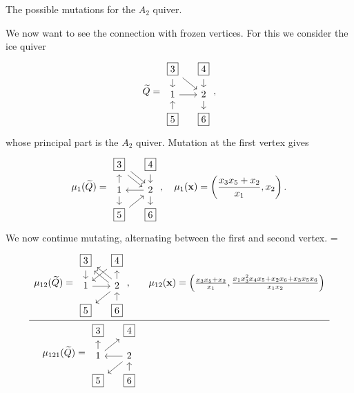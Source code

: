 \begin{example}
\begin{table}[ht!]
		\caption{The possible mutations for the $A_2$ quiver.}
		\label{table:A2_quiver_coefficients}
	\end{table}

	We now want to see the connection with frozen vertices. For this we consider the ice
	quiver
	\begin{equation*}
		\tQ = \begin{tikzcd}[sep=small]
			\boxed{3} \dar \drar & \boxed{4} \dar \\
			1 \rar & 2 \dar \\
			\boxed{5} \uar & \boxed{6}
		\end{tikzcd},
	\end{equation*}
	whose principal part is the $A_2$ quiver. Mutation at the first vertex gives
	\begin{equation*}
		\mu_1(\tQ) = \begin{tikzcd}[sep=small]
			\boxed{3} \ar[dr, shift left] \ar[dr, shift right] & \boxed{4} \dar \\
			1 \uar \dar & 2 \lar \dar \\
			\boxed{5} \urar & \boxed{6}
		\end{tikzcd},\quad
		\mu_1(\bx) = \left(\frac{x_3x_5 + x_2}{x_1}, x_2\right).
	\end{equation*}
	We now continue mutating, alternating between the first and second vertex.
		{
			\everymath={\displaystyle}
			\begin{equation*}
				\begin{array}{rc}
					\mu_{12}(\tQ) = \begin{tikzcd}[sep=small, ampersand replacement=\&]
						                \boxed{3} \dar \ar[dr, shift left, leftarrow] \ar[dr, shift right, leftarrow] \& \boxed{4} \dlar \\
						                1  \rar \& 2 \uar \dlar  \\
						                \boxed{5} \& \boxed{6} \uar
					                \end{tikzcd},\quad &
					\mu_{12}(\bx) = \left(\frac{x_3x_5 + x_2}{x_1}, \frac{x_{1} x_{3}^{2} x_{4} x_{5} + x_{2} x_{6} + x_{3} x_{5} x_{6}}{x_{1} x_{2}}\right)                 \\
					\hline
					\mu_{121}(\tQ) = \begin{tikzcd}[sep=small, ampersand replacement=\&]
						                 \boxed{3}  \& \boxed{4}  \\
						                 1  \uar \urar \& 2 \lar \dlar  \\
						                 \boxed{5} \& \boxed{6} \uar

\end{tikzcd}
\end{array}
\end{equation*}}
\end{example}
